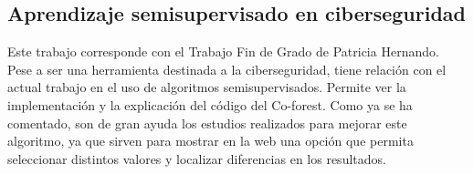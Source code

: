 
\subsection{Aprendizaje semisupervisado en ciberseguridad}
Este trabajo corresponde con el Trabajo Fin de Grado de Patricia Hernando. Pese a ser una herramienta destinada a la ciberseguridad, tiene relación con el actual trabajo en el uso de algoritmos semisupervisados. Permite ver la implementación y la explicación del código del Co-forest. Como ya se ha comentado, son de gran ayuda los estudios realizados para mejorar este algoritmo, ya que sirven para mostrar en la web una opción que permita seleccionar distintos valores y localizar diferencias en los resultados.